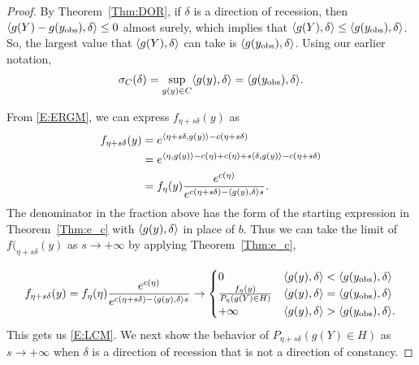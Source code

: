 \begin{proof}
By Theorem~\ref{Thm:DOR}, if $\delta$ is a direction of recession, then 
$\langle g(Y) - g(y_{\text{obs}}), \delta \rangle \leq 0$ almost surely, which implies 
that $\langle g(Y), \delta \rangle \leq \langle g(y_{\text{obs}}), \delta \rangle$.  
So, the largest value that $\langle g(Y), \delta \rangle$ can take is 
$\langle g(y_{\text{obs}}), \delta \rangle$.  Using our earlier notation, 
\begin{align*}
\sigma_C(\delta) = \sup_{g(y) \in C}\langle g(y), \delta \rangle = 
\langle g(y_{\text{obs}}), \delta \rangle.
\end{align*}

From \eqref{E:ERGM}, we can express $f_{\eta+s\delta}(y)$ as
\begin{align*}
 f_{\eta+s\delta}(y) &= e^{ \langle \eta+s\delta,g(y) \rangle - c(\eta+s\delta)  } \\
 &= e^{ \langle \eta,g(y) \rangle -c(\eta)+c(\eta) + s\langle \delta,g(y) \rangle - c(\eta+s\delta) } \\
 	&= f_\eta(y) \frac{e^{c(\eta)}}{e^{ c(\eta+s\delta) - \langle g(y),\delta \rangle
s } }.
\end{align*}
The denominator in the fraction above has the form of the starting expression in 
Theorem~\ref{Thm:e_c} with $\langle g(y),\delta \rangle$ in place of $b$.
Thus we can take the limit of $f(_{\eta+s\delta}(y)$ as
$s \to +\infty$ by applying Theorem~\ref{Thm:e_c},

\begin{align*}
	f_{\eta+s\delta}(y) = f_\eta(\eta) \frac{e^{c(\eta)}}{e^{ c(\eta+s
\delta) - \langle g(y),\delta \rangle s } } 
	\to	
			\begin{cases} 
			0 					& \langle g(y),\delta \rangle < \langle g(y_{\text{obs}}),\delta \rangle \\
			\frac{f_\eta(y)}{P_\eta(g(Y) \in H)} 	& 
								\langle g(y),\delta \rangle = \langle g(y_{\text{obs}}),\delta \rangle \\
			+\infty				& \langle g(y),\delta \rangle > \langle g(y_{\text{obs}}),\delta \rangle.
			\end{cases}
\end{align*}
This gets us \eqref{E:LCM}.  We next show the behavior of 
$P_{\eta+s\delta}(g(Y) \in H)$ as $s \to +\infty$ when $\delta$ is a direction of
recession that is not a direction of constancy.


\end{proof}
